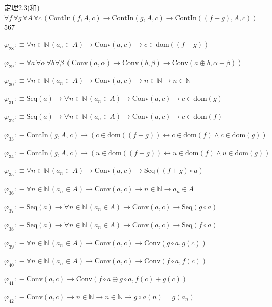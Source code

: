 \begin{fullproof}{定理2.3(和)}{$\forall f\,\forall g\,\forall A\,\forall c\,(\mathrm{ContIn}(f,A,c) \to \mathrm{ContIn}(g,A,c) \to \mathrm{ContIn}((f + g),A,c))$}{567}
\begin{abbrevlist}
\item $\varphi_{28} :\equiv \forall n \in \mathbb{N}\,(a_{n} \in A) \to \mathrm{Conv}(a,c) \to c \in \mathrm{dom}((f + g))$
\item $\varphi_{29} :\equiv \forall a\,\forall \alpha\,\forall b\,\forall \beta\,(\mathrm{Conv}(a,\alpha) \to \mathrm{Conv}(b,\beta) \to \mathrm{Conv}(a \oplus b,\alpha + \beta))$
\item $\varphi_{30} :\equiv \forall n \in \mathbb{N}\,(a_{n} \in A) \to \mathrm{Conv}(a,c) \to n \in \mathbb{N} \to n \in \mathbb{N}$
\item $\varphi_{31} :\equiv \mathrm{Seq}(a) \to \forall n \in \mathbb{N}\,(a_{n} \in A) \to \mathrm{Conv}(a,c) \to c \in \mathrm{dom}(g)$
\item $\varphi_{32} :\equiv \mathrm{Seq}(a) \to \forall n \in \mathbb{N}\,(a_{n} \in A) \to \mathrm{Conv}(a,c) \to c \in \mathrm{dom}(f)$
\item $\varphi_{33} :\equiv \mathrm{ContIn}(g,A,c) \to (c \in \mathrm{dom}((f + g)) \leftrightarrow c \in \mathrm{dom}(f) \land c \in \mathrm{dom}(g))$
\item $\varphi_{34} :\equiv \mathrm{ContIn}(g,A,c) \to (u \in \mathrm{dom}((f + g)) \leftrightarrow u \in \mathrm{dom}(f) \land u \in \mathrm{dom}(g))$
\item $\varphi_{35} :\equiv \forall n \in \mathbb{N}\,(a_{n} \in A) \to \mathrm{Conv}(a,c) \to \mathrm{Seq}((f + g) \circ a)$
\item $\varphi_{36} :\equiv \forall n \in \mathbb{N}\,(a_{n} \in A) \to \mathrm{Conv}(a,c) \to n \in \mathbb{N} \to a_{n} \in A$
\item $\varphi_{37} :\equiv \mathrm{Seq}(a) \to \forall n \in \mathbb{N}\,(a_{n} \in A) \to \mathrm{Conv}(a,c) \to \mathrm{Seq}(g \circ a)$
\item $\varphi_{38} :\equiv \mathrm{Seq}(a) \to \forall n \in \mathbb{N}\,(a_{n} \in A) \to \mathrm{Conv}(a,c) \to \mathrm{Seq}(f \circ a)$
\item $\varphi_{39} :\equiv \forall n \in \mathbb{N}\,(a_{n} \in A) \to \mathrm{Conv}(a,c) \to \mathrm{Conv}(g \circ a,g(c))$
\item $\varphi_{40} :\equiv \forall n \in \mathbb{N}\,(a_{n} \in A) \to \mathrm{Conv}(a,c) \to \mathrm{Conv}(f \circ a,f(c))$
\item $\varphi_{41} :\equiv \mathrm{Conv}(a,c) \to \mathrm{Conv}(f \circ a \oplus g \circ a,f(c) + g(c))$
\item $\varphi_{42} :\equiv \mathrm{Conv}(a,c) \to n \in \mathbb{N} \to n \in \mathbb{N} \to g \circ a(n) = g(a_{n})$

\end{abbrevlist}
\end{fullproof}
